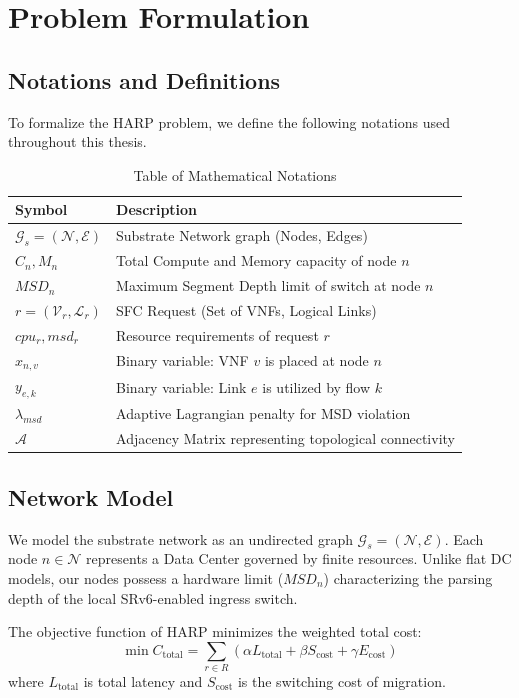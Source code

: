 \documentclass[12pt, a4paper, reqno, oneside]{book}
\begin{document}
\section{Problem Formulation}
\label{sec:problem_formulation}

\subsection{Notations and Definitions}
To formalize the HARP problem, we define the following notations used throughout this thesis.

\begin{longtable}{ll}
\caption{Table of Mathematical Notations} \label{table:notations} \\
\toprule
\textbf{Symbol} & \textbf{Description} \\
\midrule
$\mathcal{G}_s = (\mathcal{N}, \mathcal{E})$ & Substrate Network graph (Nodes, Edges) \\
$C_n, M_n$ & Total Compute and Memory capacity of node $n$ \\
$MSD_n$ & Maximum Segment Depth limit of switch at node $n$ \\
$r = (\mathcal{V}_r, \mathcal{L}_r)$ & SFC Request (Set of VNFs, Logical Links) \\
$cpu_r, msd_r$ & Resource requirements of request $r$ \\
$x_{n,v}$ & Binary variable: VNF $v$ is placed at node $n$ \\
$y_{e,k}$ & Binary variable: Link $e$ is utilized by flow $k$ \\
$\lambda_{msd}$ & Adaptive Lagrangian penalty for MSD violation \\
$\mathcal{A}$ & Adjacency Matrix representing topological connectivity \\
\bottomrule
\end{longtable}

\subsection{Network Model}
We model the substrate network as an undirected graph $\mathcal{G}_s = (\mathcal{N}, \mathcal{E})$. Each node $n \in \mathcal{N}$ represents a Data Center governed by finite resources. Unlike flat DC models, our nodes possess a hardware limit ($MSD_n$) characterizing the parsing depth of the local SRv6-enabled ingress switch.

The objective function of HARP minimizes the weighted total cost:
\begin{equation}
\min C_{\text{total}} = \sum_{r \in R} \left( \alpha L_{\text{total}} + \beta S_{\text{cost}} + \gamma E_{\text{cost}} \right)
\end{equation}
where $L_{\text{total}}$ is total latency and $S_{\text{cost}}$ is the switching cost of migration.
\end{document}
